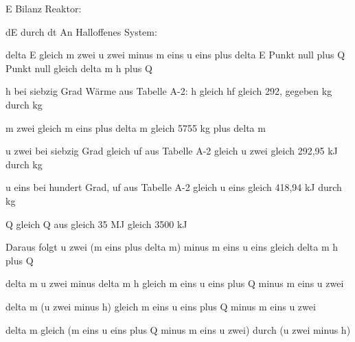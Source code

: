E Bilanz Reaktor:

dE durch dt An Halloffenes System:

delta E gleich m zwei u zwei minus m eins u eins plus delta E Punkt null plus Q Punkt null gleich delta m h plus Q

h bei siebzig Grad Wärme aus Tabelle A-2: h gleich hf gleich 292, gegeben kg durch kg

m zwei gleich m eins plus delta m gleich 5755 kg plus delta m

u zwei bei siebzig Grad gleich uf aus Tabelle A-2 gleich u zwei gleich 292,95 kJ durch kg

u eins bei hundert Grad, uf aus Tabelle A-2 gleich u eins gleich 418,94 kJ durch kg

Q gleich Q aus gleich 35 MJ gleich 3500 kJ

Daraus folgt u zwei (m eins plus delta m) minus m eins u eins gleich delta m h plus Q

delta m u zwei minus delta m h gleich m eins u eins plus Q minus m eins u zwei

delta m (u zwei minus h) gleich m eins u eins plus Q minus m eins u zwei

delta m gleich (m eins u eins plus Q minus m eins u zwei) durch (u zwei minus h)